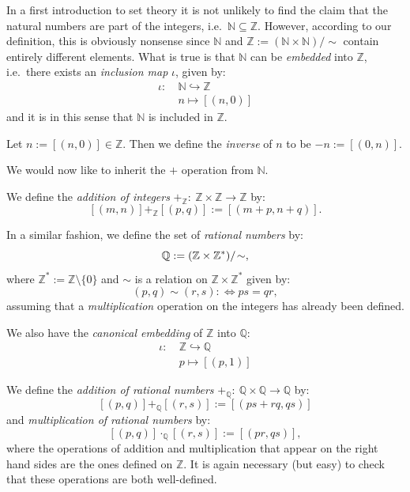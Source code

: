 \documentclass[root.tex]{subfiles}
\begin{document}
\begin{remark}
 In a first introduction to set theory it is not unlikely to find the claim that the natural numbers are part of the integers, i.e.\ $\mathbb{N} \subseteq \mathbb{Z}$. However, according to our definition, this is obviously nonsense since $\mathbb{N}$ and $\mathbb{Z}:=(\mathbb{N}\times\mathbb{N})/\!\sim$ contain entirely different elements. What is true is that $\mathbb{N}$ can be \emph{embedded} into $\mathbb{Z}$, i.e.\ there exists an \emph{inclusion map} $\iota$, given by:
\begin{align*}
  \iota :\ & \mathbb{N} \hookrightarrow  \mathbb{Z}\\
 & n  \mapsto  [(n,0)]
\end{align*}
and it is in this sense that $\mathbb{N}$ is included in $\mathbb{Z}$.
\end{remark}

\begin{mydef}
Let $n := [(n,0)] \in \mathbb{Z}$. Then we define the \emph{inverse} of $n$ to be $-n:=[(0,n)]$. 
\end{mydef}

We would now like to inherit the $+$ operation from $\mathbb{N}$.

\begin{mydef}
We define the \emph{addition of integers} $+_\mathbb{Z}:\ \mathbb{Z}\times\mathbb{Z}\to\mathbb{Z}$ by:
$$
[(m,n)] +_\mathbb{Z} [(p,q)] := [(m+p,n+q)].
$$
\end{mydef}


\begin{mydef}
In a similar fashion, we define the set of \emph{rational numbers} by:
$$
\mathbb{Q}\index{$mathbb{Q}$} := (\mathbb{Z}\times\mathbb{Z}^*)/\!\sim,
$$
where $\mathbb{Z}^*:=\mathbb{Z}\setminus\{0\}$ and $\sim$ is a relation on $\mathbb{Z}\times\mathbb{Z}^*$ given by:
$$
(p,q)\sim(r,s) :\Leftrightarrow ps = qr,
$$
assuming that a \emph{multiplication} operation on the integers has already been defined.
\end{mydef}

 We also have the \emph{canonical embedding} of $\mathbb{Z}$ into $\mathbb{Q}$:
\begin{align*}
 \iota :\ & \mathbb{Z}  \hookrightarrow  \mathbb{Q}\\
 & p  \mapsto  [(p,1)]
\end{align*}

\begin{mydef}
We define the \emph{addition of rational numbers} $+_\mathbb{Q}:\ \mathbb{Q}\times\mathbb{Q}\rightarrow\mathbb{Q}$ by:
$$
[(p,q)] +_\mathbb{Q} [(r,s)] := [(ps+rq,qs)]
$$
and \emph{multiplication of rational numbers} by:
$$
[(p,q)] \cdot_\mathbb{Q} [(r,s)] := [(pr,qs)],
$$
where the operations of addition and multiplication that appear on the right hand sides are the ones defined on $\mathbb{Z}$. It is again necessary (but easy) to check that these operations are both well-defined.
\end{mydef}
\end{document}
